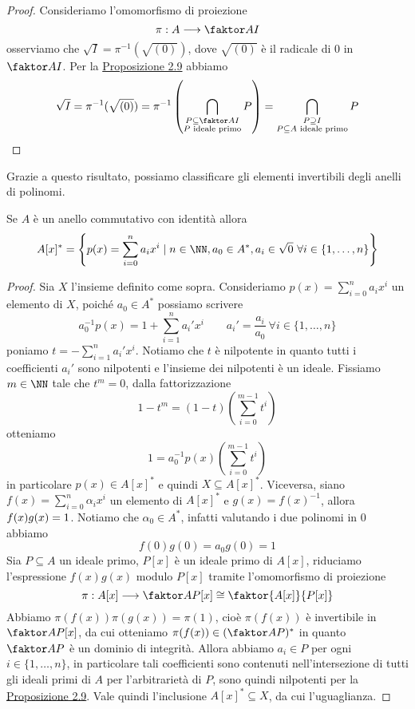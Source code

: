 \documentclass[11pt]{scrartcl}
\begin{document}
\begin{proof}
    Consideriamo l'omomorfismo di proiezione
    \[
        \pi: A\longrightarrow \faktor A I
    \]
    osserviamo che $\sqrt{I} = \pi^{-1}(\sqrt{(0)})$, dove $\sqrt{(0)}$ è il radicale di 
    $0$ in $\faktor A I$. Per la \hyperref[prop2.9]{Proposizione 2.9}
    abbiamo
    \[
        \sqrt{I} = \pi^{-1}(\sqrt{(0)}) = \pi^{-1}\left(\bigcap_{\substack{
            P\subseteq \faktor A I\\ P \text{ ideale primo}}} P\right) = 
            \bigcap_{\substack{P\supseteq I\\P \subseteq A\text{ ideale primo}}}P
    \]
\end{proof}

Grazie a questo risultato, possiamo classificare gli elementi invertibili 
degli anelli di polinomi.

\begin{proposition}
    Se $A$ è un anello commutativo con identità allora 
    \[
        A[x]^* = \left\{p(x) = \sum_{i = 0}^n a_ix^i\mid n \in \NN,
        a_0 \in A^*, a_i \in \sqrt{0}~\forall i \in \{1, \ldots, n\}\right\}
    \]
\end{proposition}

\begin{proof}
    Sia $X$ l'insieme definito come sopra. Consideriamo 
    $p(x) = \displaystyle\sum_{i = 0}^n a_i x^i$ un elemento di $X$, poiché
    $a_0 \in A^*$ possiamo scrivere 
    \[
        a_0^{-1}p(x) = 1 + \sum_{i = 1}^n a_i'x^i \qquad 
        a_i' = \frac{a_i}{a_0}~\forall i \in \{1, \ldots,n\}
    \]
    poniamo $t = \displaystyle -\sum_{i = 1}^n a_i'x^i$. Notiamo che $t$ è
    nilpotente in quanto tutti i coefficienti $a_i'$ sono nilpotenti e l'insieme
    dei nilpotenti è un ideale. Fissiamo $m \in \NN$ tale che $t^m = 0$, 
    dalla fattorizzazione 
    \[
        1 - t^m = (1 - t)\left(\sum_{i = 0}^{m - 1}t^i\right)
    \]
    otteniamo 
    \[
        1 = a_0^{-1}p(x)\left(\sum_{i = 0}^{m - 1}t^i\right)
    \]
    in particolare $p(x) \in A[x]^*$ e quindi $X \subseteq A[x]^*$.\newline
    Viceversa, siano $f(x) = \displaystyle\sum_{i = 0}^n\alpha_ix^i$ un 
    elemento di $A[x]^*$ e $g(x) = f(x)^{-1}$, allora $f(x)g(x) = \nolinebreak 1$.
    Notiamo che $\alpha_0 \in A^*$, infatti valutando i due polinomi in 0
    abbiamo
    \[
        f(0)g(0) = a_0g(0) = 1
    \]
    Sia $P \subseteq A$ un ideale primo, $P[x]$ è un ideale primo di $A[x]$,
    riduciamo l'espressione $f(x)g(x)$ modulo $P[x]$ tramite l'omomorfismo 
    di proiezione
    \[
        \pi: A[x]\longrightarrow \faktor A P [x] \cong \faktor{A[x]}{P[x]}
    \]
    Abbiamo $\pi(f(x))\pi(g(x)) = \pi(1)$, cioè $\pi(f(x))$ è invertibile in 
    $\faktor A P [x]$, da cui otteniamo $\pi(f(x)) \in (\faktor A P)^*$ in quanto $\faktor A P$
    è un dominio di integrità. Allora abbiamo $a_i \in P$ per ogni $i \in \{1, \ldots, n\}$,
    in particolare tali coefficienti sono contenuti nell'intersezione di tutti
    gli ideali primi di $A$ per l'arbitrarietà di $P$, sono quindi nilpotenti
    per la \hyperref[prop2.9]{Proposizione 2.9}. Vale quindi l'inclusione 
    $A[x]^* \subseteq X$, da cui l'uguaglianza.
\end{proof}
\end{document}
